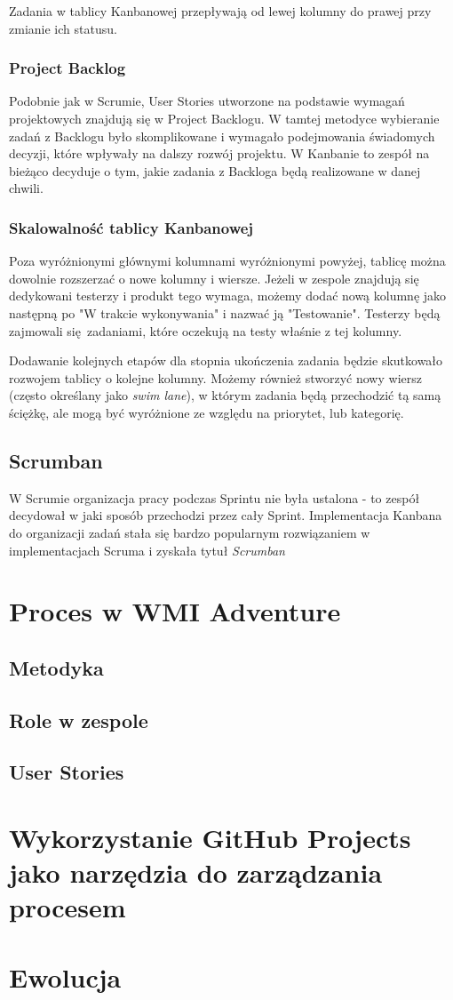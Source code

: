 \documentclass{article}
\begin{document}
Zadania w tablicy Kanbanowej przepływają od lewej kolumny do prawej przy zmianie ich statusu.

\subsubsection*{Project Backlog}
Podobnie jak w Scrumie, User Stories utworzone na podstawie wymagań projektowych znajdują się w Project Backlogu. W tamtej metodyce wybieranie zadań z Backlogu było skomplikowane i wymagało podejmowania świadomych decyzji, które wpływały na dalszy rozwój projektu. W Kanbanie to zespół na bieżąco decyduje o tym, jakie zadania z Backloga będą realizowane w danej chwili.

\subsubsection*{Skalowalność tablicy Kanbanowej}
Poza wyróżnionymi głównymi kolumnami wyróżnionymi powyżej, tablicę można dowolnie rozszerzać o nowe kolumny i wiersze. Jeżeli w zespole znajdują się dedykowani testerzy i produkt tego wymaga, możemy dodać nową kolumnę jako następną po "W trakcie wykonywania" i nazwać ją "Testowanie". Testerzy będą zajmowali się zadaniami, które oczekują na testy właśnie z tej kolumny.

Dodawanie kolejnych etapów dla stopnia ukończenia zadania będzie skutkowało rozwojem tablicy o kolejne kolumny. Możemy również stworzyć nowy wiersz (często określany jako \textit{swim lane}), w którym zadania będą przechodzić tą samą ściężkę, ale mogą być wyróżnione ze względu na priorytet, lub kategorię.

\subsection{Scrumban}
W Scrumie organizacja pracy podczas Sprintu nie była ustalona - to zespół decydował w jaki sposób przechodzi przez cały Sprint. Implementacja Kanbana do organizacji zadań stała się bardzo popularnym rozwiązaniem w implementacjach Scruma i zyskała tytuł \textit{Scrumban}


\section{Proces w WMI Adventure}

\subsection{Metodyka}
\subsection{Role w zespole}
\subsection{User Stories}

\section{Wykorzystanie GitHub Projects jako narzędzia do zarządzania procesem}

\section{Ewolucja}

\printbibliography
\end{document}
